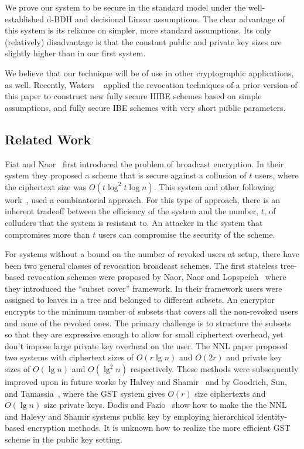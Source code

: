 \documentclass[a4paper, 11pt]{article}
\theoremstyle{definition}
\begin{document}
We prove our system to be secure in the standard model under the well-established d-BDH and decisional Linear assumptions. The clear advantage of this system is its reliance on simpler, more standard assumptions. Its only (relatively) disadvantage is that the constant public and private key sizes are slightly higher than in our first system.

We believe that our technique will be of use in other cryptographic
applications, as well.
Recently, Waters ~\cite{W09} applied the revocation techniques of a prior version of this paper to construct new fully
secure HIBE schemes based on simple assumptions, and fully secure IBE
schemes with very short public parameters.


\subsection{Related Work}

Fiat and Naor~\cite{fn93} first introduced the problem of broadcast
encryption.  In their system they proposed a scheme that is secure
against a collusion of $t$ users, where the ciphertext size was
$O(t\log^2 t \log n)$. This system and other following
work~\cite{S97,ST98,SW98,KRS,GSY99,GSW00}, used a combinatorial approach.
For this type of approach, there is an inherent tradeoff
between the efficiency of the system and the number, $t$, of colluders
that the system is resistant to. An attacker in the system that
compromises more than $t$ users can compromise the security of the
scheme.

For systems without a bound on the number of revoked users at setup, there have been two general classes of revocation broadcast
schemes.  The first stateless tree-based revocation schemes were
proposed by Naor, Naor and Lopspeich~\cite{NNL} where they introduced
the ``subset cover'' framework. In their framework users were assigned
to leaves in a tree and belonged to different subsets.  An encryptor
encrypts to the minimum number of subsets that covers all the
non-revoked users and none of the revoked ones. The primary challenge
is to structure the subsets so that they are expressive enough to allow
for small ciphertext overhead, yet don't impose large private key
overhead on the user. The NNL paper proposed two systems with
ciphertext sizes of $O(r \lg n)$ and $O(2r)$ and private key sizes of
$O(\lg n)$ and $O(\lg^2 n)$ respectively.  These methods were
subsequently improved upon in future works by Halvey and
Shamir~\cite{HS} and by Goodrich, Sun, and Tamassia~\cite{G}, where
the GST system gives $O(r)$ size ciphertexts and $O(\lg n)$ size
private keys.  Dodis and Fazio~\cite{DF02} show how to make the the
NNL and Halevy and Shamir systems public key by employing hierarchical
identity-based encryption methods. It is unknown how to realize the
more efficient GST scheme in the public key setting.
\end{document}
